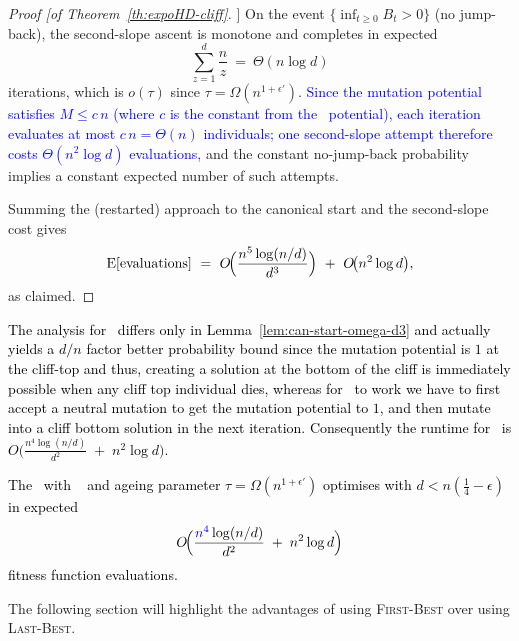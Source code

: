 \begin{proof}[Proof [of Theorem~\ref{th:expoHD-cliff}]]
	\smallskip
	On the event $\{\inf_{t\ge 0} B_t>0\}$ (no jump-back), the second-slope ascent is monotone and completes in expected
	\[
	\sum_{z=1}^{d}\frac{n}{z}\ =\ \Theta(n\log d)
	\]
	iterations, which is $o(\tau)$ since $\tau=\Omega(n^{1+\epsilon'})$. \textcolor{blue}{Since the mutation potential satisfies $M \le c\,n$ (where $c$ is the constant
	from the \linHD\ potential), each iteration evaluates at most $c\,n =\Theta(n)$
	individuals; one second-slope attempt therefore costs $\Theta(n^{2}\log d)$
	evaluations,} and the constant no-jump-back probability implies a constant expected number of such attempts.
	
	\smallskip

	Summing the (restarted) approach to the canonical start and the second-slope cost gives
	\[
	\text{E}[\text{evaluations}]
	\ =\ O\!\Big(\frac{n^{5}\log(n/d)}{d^{3}}\Big)\ +\ O\!\big(n^{2}\log d\big),
	\]
	as claimed.
\end{proof}

\textcolor{black}{The analysis for \lastBest~differs only in Lemma~\ref{lem:can-start-omega-d3} and actually yields a $d/n$ factor better probability bound since the mutation potential is $1$ at the cliff-top and thus, creating a solution at the bottom of the cliff is immediately possible when any cliff top individual dies, whereas for \firstBest~to work we have to first accept a neutral mutation to get the mutation potential to $1$, and then mutate into a cliff bottom solution in the next iteration. Consequently the runtime for \lastBest~is  
$O\!\Big(\frac{n^{4}\log(n/d)}{d^{2}} \;+\; n^{2}\log d\Big)$.}

\textcolor{black}{
\begin{corollary}
	The %
	\textcolor{black}{\lastBest~with} \linHD\  and ageing parameter $\tau=\Omega(n^{1+\epsilon'})$
	optimises \cliff{} with $d<n(\tfrac{1}{4}-\epsilon)$ in expected
	\[
	O\!\Big(\frac{\textcolor{blue}{n^{4}}\log(n/d)}{d^{2}} \;+\; n^{2}\log d\Big)
	\]
	fitness function evaluations.
\end{corollary}
}
The following section will highlight the advantages of using \textsc{First-Best} over using \textsc{Last-Best}.

